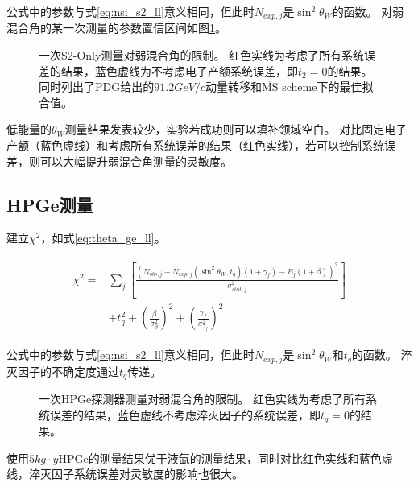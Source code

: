 公式中的参数与式\ref{eq:nsi_s2_ll}意义相同，但此时$N_{exp,j}$是$\sin^2\theta_W$的函数。
对弱混合角的某一次测量的参数置信区间如图\ref{fig:thetaw_sensitivity_s2only}。

\begin{figure}
  \centering
  
  \caption{\label{fig:thetaw_sensitivity_s2only} 一次S2-Only测量对弱混合角的限制。
  红色实线为考虑了所有系统误差的结果，蓝色虚线为不考虑电子产额系统误差，即$t_2=0$的结果。
  同时列出了PDG给出的$91.2\si{GeV/c}$动量转移和$\overline{\mathrm{MS}}$ scheme下的最佳拟合值\cite{particle_data_group_review_2020}。}
\end{figure}

低能量的$\theta_W$测量结果发表较少，实验若成功则可以填补领域空白。
对比固定电子产额（蓝色虚线）和考虑所有系统误差的结果（红色实线），若可以控制系统误差，则可以大幅提升弱混合角测量的灵敏度。

\subsection{HPGe测量}

建立$\chi^2$，如式\ref{eq:theta_ge_ll}。

\begin{align}
    \label{eq:theta_ge_ll}
    \begin{split}
    \chi^2 =& \sum_j\left[\frac{\left(N_{obs,j} - N_{exp,j}(\sin^2\theta_W, t_q)(1 + \gamma_f) 
    - B_{j}(1 + \beta)\right)^2}{\sigma^2_{stat,j}}\right] \\
    & + t_q^2 + (\frac{\beta}{\sigma^2_{\beta}})^2 + (\frac{\gamma_f}{\sigma^2_{\gamma_f}})^2
    \end{split}
\end{align}

公式中的参数与式\ref{eq:nsi_s2_ll}意义相同，但此时$N_{exp,j}$是$\sin^2\theta_W$和$t_q$的函数。
淬灭因子的不确定度通过$t_q$传递。

\begin{figure}
    \centering
    
    \caption{\label{fig:thetaw_sensitivity_ge} 一次HPGe探测器测量对弱混合角的限制。
    红色实线为考虑了所有系统误差的结果，蓝色虚线不考虑淬灭因子的系统误差，即$t_q=0$的结果。}
\end{figure}

使用$5\si{kg\cdot y}$HPGe的测量结果优于液氙的测量结果，同时对比红色实线和蓝色虚线，淬灭因子系统误差对灵敏度的影响也很大。

